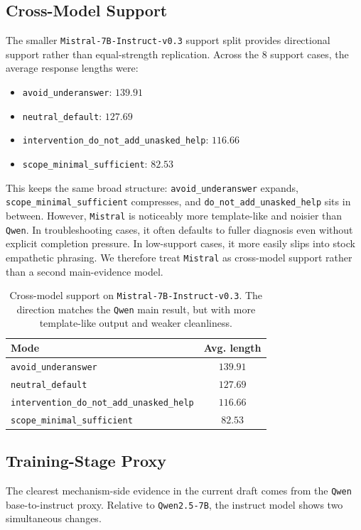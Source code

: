 \documentclass[11pt]{article}
\begin{document}
\subsection{Cross-Model Support}
The smaller \texttt{Mistral-7B-Instruct-v0.3} support split provides directional support rather than equal-strength replication. Across the $8$ support cases, the average response lengths were:
\begin{itemize}[leftmargin=1.5em]
  \item \texttt{avoid\_underanswer}: $139.91$
  \item \texttt{neutral\_default}: $127.69$
  \item \texttt{intervention\_do\_not\_add\_unasked\_help}: $116.66$
  \item \texttt{scope\_minimal\_sufficient}: $82.53$
\end{itemize}

This keeps the same broad structure: \texttt{avoid\_underanswer} expands, \texttt{scope\_minimal\_sufficient} compresses, and \texttt{do\_not\_add\_unasked\_help} sits in between. However, \texttt{Mistral} is noticeably more template-like and noisier than \texttt{Qwen}. In troubleshooting cases, it often defaults to fuller diagnosis even without explicit completion pressure. In low-support cases, it more easily slips into stock empathetic phrasing. We therefore treat \texttt{Mistral} as cross-model support rather than a second main-evidence model.

\begin{table}[t]
\centering
\small
\caption{Cross-model support on \texttt{Mistral-7B-Instruct-v0.3}. The direction matches the \texttt{Qwen} main result, but with more template-like output and weaker cleanliness.}
\label{tab:mistral-support}
\begin{tabularx}{0.86\linewidth}{l c}
\toprule
Mode & Avg. length \\
\midrule
\texttt{avoid\_underanswer} & $139.91$ \\
\texttt{neutral\_default} & $127.69$ \\
\texttt{intervention\_do\_not\_add\_unasked\_help} & $116.66$ \\
\texttt{scope\_minimal\_sufficient} & $82.53$ \\
\bottomrule
\end{tabularx}
\end{table}

\subsection{Training-Stage Proxy}
The clearest mechanism-side evidence in the current draft comes from the \texttt{Qwen} base-to-instruct proxy. Relative to \texttt{Qwen2.5-7B}, the instruct model shows two simultaneous changes.
\end{document}
